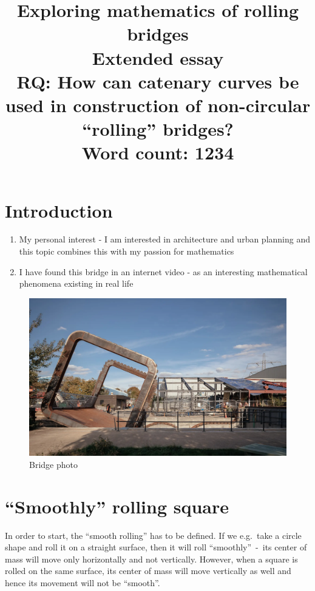 \documentclass[12pt]{article}
\title{Exploring mathematics of rolling bridges \\
    \large Extended essay \\
    \large RQ: How can catenary curves be used in construction of non-circular ``rolling'' bridges? \\
    \vspace{12pt} Word count: 1234}
\date{}
\author{}
\begin{document}
    \maketitle
    \newpage
    \tableofcontents
    \newpage
    
    \section{Introduction}
    
        \begin{enumerate}
            \item My personal interest - I am interested in architecture and urban planning and this topic combines this with my passion for mathematics
            \item I have found this bridge in an internet video - as an interesting mathematical phenomena existing in real life
        \end{enumerate}

        \begin{figure}[H]
            \centering
            \includegraphics[width=0.75\linewidth]{images/bridge.png}
            \caption[Bridge photo]{Bridge photo\footnotemark}\label{fig:bridge_photo}
        \end{figure}

    \section{``Smoothly'' rolling square}

        In order to start, the ``smooth rolling'' has to be defined. If we e.g.\ take a circle shape and roll it on a straight surface, then it will roll ``smoothly''~-~its center of mass will move only horizontally and not vertically. However, when a square is rolled on the same surface, its center of mass will move vertically as well and hence its movement will not be ``smooth''.
\end{document}

